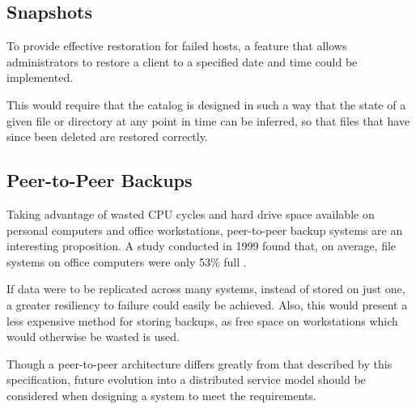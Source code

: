\subsection{Snapshots}

To provide effective restoration for failed hosts, a feature that allows
administrators to restore a client to a specified date and time could be
implemented.

This would require that the catalog is designed in such a way that the state of
a given file or directory at any point in time can be inferred, so that files
that have since been deleted are restored correctly.

\subsection{Peer-to-Peer Backups}

Taking advantage of wasted CPU cycles and hard drive space available on
personal computers and office workstations, peer-to-peer backup systems are an
interesting proposition. A study conducted in 1999 found that, on average, file
systems on office computers were only 53\% full \cite{douceur1999}.

If data were to be replicated across many systems, instead of stored on just
one, a greater resiliency to failure could easily be achieved. Also, this would
present a less expensive method for storing backups, as free space on
workstations which would otherwise be wasted is used.

Though a peer-to-peer architecture differs greatly from that described by this
specification, future evolution into a distributed service model should be
considered when designing a system to meet the requirements.
